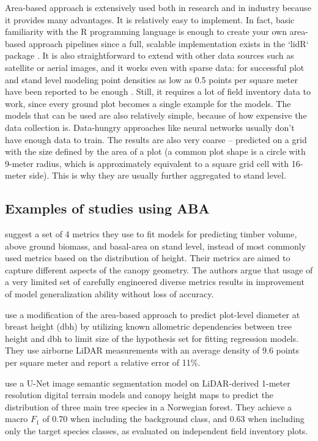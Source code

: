 Area-based approach is extensively used both in research and in industry because it provides many advantages.
It is relatively easy to implement.
In fact, basic familiarity with the R programming language is enough to create your own area-based approach pipelines since a full, scalable implementation exists in the `lidR` package \cite{rousselLidRPackage2020}.
It is also straightforward to extend with other data sources such as satellite or aerial images, and it works even with sparse data: for successful plot and stand level modeling point densities as low as 0.5 points per square meter have been reported to be enough \cite{treitzLiDARSamplingDensity2012, jakubowskiTradeoffsLidarPulse2013}.
Still, it requires a lot of field inventory data to work, since every ground plot becomes a single example for the models.
The models that can be used are also relatively simple, because of how expensive the data collection is.
Data-hungry approaches like neural networks usually don't have enough data to train.
The results are also very coarse – predicted on a grid with the size defined by the area of a plot (a common plot shape is a circle with 9-meter radius, which is approximately equivalent to a square grid cell with 16-meter side).
This is why they are usually further aggregated to stand level.

\subsection{Examples of studies using ABA}

\citet{bouvierGeneralizingPredictiveModels2015} suggest a set of 4 metrics they use to fit models for predicting timber volume, above ground biomass, and basal-area on stand level, instead of most commonly used metrics based on the distribution of height.
Their metrics are aimed to capture different aspects of the canopy geometry.
The authors argue that usage of a very limited set of carefully engineered diverse metrics results in improvement of model generalization ability without loss of accuracy.

\citet{zhangImprovedAreabasedApproach2023} use a modification of the area-based approach to predict plot-level diameter at breast height (dbh) by utilizing known allometric dependencies between tree height and dbh to limit size of the hypothesis set for fitting regression models.
They use airborne LiDAR measurements with an average density of 9.6 points per square meter and report a relative error of 11\%.

\citet{vermeerLidarbasedNorwegianTree2023} use a U-Net \citep{ronnebergerUNetConvolutionalNetworks2015} image semantic segmentation model on LiDAR-derived 1-meter resolution digital terrain models and canopy height maps to predict the distribution of three main tree species in a Norwegian forest.
They achieve a macro $F_1$ of 0.70 when including the background class, and 0.63 when including only the target species classes, as evaluated on independent field inventory plots.

